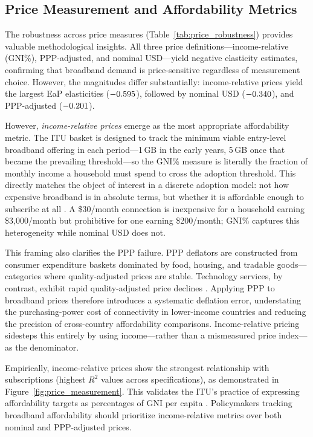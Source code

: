 \subsection{Price Measurement and Affordability Metrics}

The robustness across price measures (Table~\ref{tab:price_robustness}) provides valuable methodological insights. All three price definitions---income-relative (GNI\%), PPP-adjusted, and nominal USD---yield negative elasticity estimates, confirming that broadband demand is price-sensitive regardless of measurement choice. However, the magnitudes differ substantially: income-relative prices yield the largest EaP elasticities ($-0.595$), followed by nominal USD ($-0.340$), and PPP-adjusted ($-0.201$).

However, \textit{income-relative prices} emerge as the most appropriate affordability metric. The ITU basket is designed to track the minimum viable entry-level broadband offering in each period---1\,GB in the early years, 5\,GB once that became the prevailing threshold---so the GNI\% measure is literally the fraction of monthly income a household must spend to cross the adoption threshold. This directly matches the object of interest in a discrete adoption model: not how expensive broadband is in absolute terms, but whether it is affordable enough to subscribe at all \citep{deaton1980almost}. A \$30/month connection is inexpensive for a household earning \$3{,}000/month but prohibitive for one earning \$200/month; GNI\% captures this heterogeneity while nominal USD does not.

This framing also clarifies the PPP failure. PPP deflators are constructed from consumer expenditure baskets dominated by food, 
housing, and tradable goods---categories where quality-adjusted prices are stable. 
Technology services, by contrast, exhibit rapid quality-adjusted price declines \citep{schreyer2002oecd}. 
Applying PPP to broadband prices therefore introduces a systematic deflation error, 
understating the purchasing-power cost of connectivity in lower-income countries and 
reducing the precision of cross-country affordability comparisons. 
Income-relative pricing sidesteps this entirely by using income---rather than a mismeasured price index---as the denominator.

Empirically, income-relative prices show the strongest relationship with subscriptions (highest $R^2$ values across specifications), 
as demonstrated in Figure~\ref{fig:price_measurement}. This validates the ITU's practice of expressing 
affordability targets as percentages of GNI per capita \citep{itu2024data}. Policymakers tracking broadband affordability 
should prioritize income-relative metrics over both nominal and PPP-adjusted prices.

